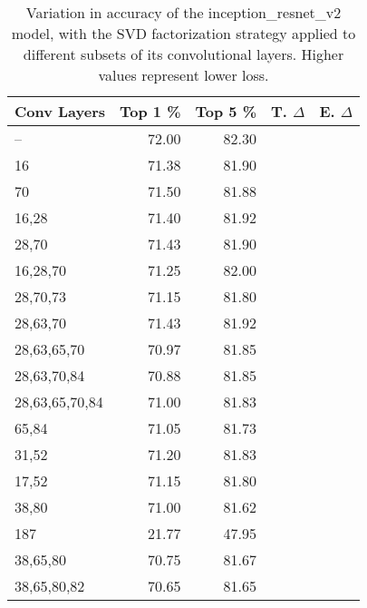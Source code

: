 \begin{table}
\centering
\begin{tabular}{|l|r|r|r|r|}
\hline
Conv Layers & Top 1 \% & Top 5 \% & T. $\Delta$ & E. $\Delta$ \\\hline
-- & 72.00 & 82.30 &  & \\\hline
16 & 71.38 & 81.90 &  &  \\\hline
70 & 71.50 & 81.88 &  &  \\\hline
16,28 & 71.40 & 81.92 &  &  \\\hline
28,70 & 71.43 & 81.90 &  &  \\\hline
16,28,70 & 71.25 & 82.00 &  &  \\\hline
28,70,73 & 71.15 & 81.80 &  &  \\\hline
28,63,70 & 71.43 & 81.92 &  &  \\\hline
28,63,65,70 & 70.97 & 81.85 &  &  \\\hline
28,63,70,84 & 70.88 & 81.85 &  &  \\\hline
28,63,65,70,84 & 71.00 & 81.83 &  &  \\\hline
65,84 & 71.05 & 81.73 &  &  \\\hline
31,52 & 71.20 & 81.83 &  &  \\\hline
17,52 & 71.15 & 81.80 &  &  \\\hline
38,80 & 71.00 & 81.62 &  &  \\\hline
187 & 21.77 & 47.95 &  &  \\\hline
38,65,80 & 70.75 & 81.67 &  &  \\\hline
38,65,80,82 & 70.65 & 81.65 &  &  \\\hline
\end{tabular}
\caption{Variation in accuracy of the inception\_resnet\_v2 model, with the SVD factorization strategy applied to different subsets of its convolutional layers. Higher values represent lower loss.}
\label{inception_resnet_v2-accuracy}
\end{table}
